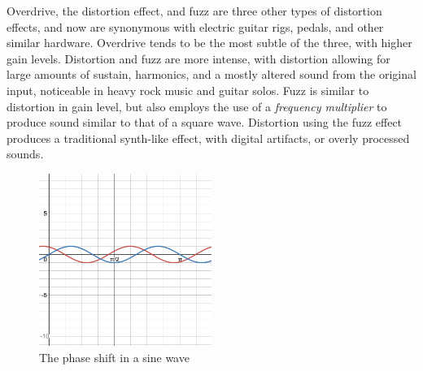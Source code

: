 Overdrive, the distortion effect, and fuzz are three other types of distortion effects, and now are synonymous with electric guitar rigs, pedals, and other similar hardware. Overdrive tends to be the most subtle of the three, with higher gain levels. Distortion and fuzz are more intense, with distortion allowing for large amounts of sustain, harmonics, and a mostly altered sound from the original input, noticeable in heavy rock music and guitar solos. Fuzz is similar to distortion in gain level, but also employs the use of a \textit{frequency multiplier} to produce sound similar to that of a square wave. Distortion using the fuzz effect produces a traditional synth-like effect, with digital artifacts, or overly processed sounds.

\begin{figure}
	\centering
	\includegraphics[width=0.5\textwidth]{figures/sine-wave-phase-shift.png}
	\caption{The phase shift in a sine wave}
	\label{fig:sine-wave-phase-shift}
\end{figure}

